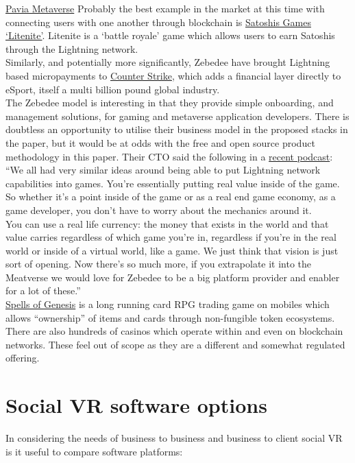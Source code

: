 \href{https://www.thesun.co.uk/tech/17348918/pavia-metaverse-cardano-crypto-game/}{Pavia Metaverse}
Probably the best example in the market at this time with connecting users with one another through blockchain is \href{https://lightnite.io/}{Satoshis Games `Litenite'}. Litenite is a `battle royale' game which allows users to earn Satoshis through the Lightning network.\\
Similarly, and potentially more significantly, Zebedee have brought Lightning based micropayments to \href{https://zebedee.io/infuse/}{Counter Strike}, which adds a financial layer directly to eSport, itself a multi billion pound global industry.\\
The Zebedee model is interesting in that they provide simple onboarding, and management solutions, for gaming and metaverse application developers. There is doubtless an opportunity to utilise their business model in the proposed stacks in the paper, but it would be at odds with the free and open source product methodology in this paper. Their CTO said the following in a \href{https://lightningjunkies.net/lightning-address-making-lightning-user-friendly-lnj052/}{recent podcast}:\\
``We all had very similar ideas around being able to put Lightning network capabilities into games. You're essentially putting real value inside of the game. So whether it's a point inside of the game or as a real end game economy, as a game developer, you don't have to worry about the mechanics around it.\\
You can use a real life currency: the money that exists in the world and that value carries regardless of which game you're in, regardless if you're in the real world or inside of a virtual world, like a game. We just think that vision is just sort of opening. Now there's so much more, if you extrapolate it into the Meatverse we would love for Zebedee to be a big platform provider and enabler for a lot of these.''\\
\href{https://spellsofgenesis.com/}{Spells of Genesis} is a long running card RPG trading game on mobiles which allows ``ownership'' of items and cards through non-fungible token ecosystems.\\
There are also hundreds of casinos which operate within and even on blockchain networks. These feel out of scope as they are a different and somewhat regulated offering.

\section{Social VR software options}
In considering the needs of business to business and business to client social VR is it useful to compare software platforms:
